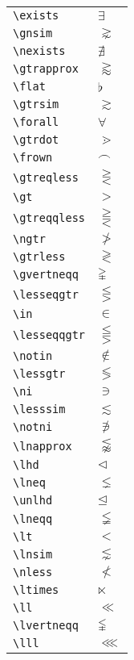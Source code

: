 \documentclass[text,xhtml,itex]{internet}
\begin{document}
\begin{tabular}{ll}
\verb+\exists+ & \(\exists\) \\
\verb+\gnsim+ & \(\gnsim\) \\
\verb+\nexists+               & \(\nexists\) \\
\verb+\gtrapprox+ & \(\gtrapprox\) \\
\verb+\flat+ & \(\flat\)            \\
\verb+\gtrsim+ & \(\gtrsim\) \\
\verb+\forall+ & \(\forall\) \\
\verb+\gtrdot+ & \(\gtrdot\) \\
\verb+\frown+                 & \(\frown\) \\
\verb+\gtreqless+ & \(\gtreqless\) \\
\verb+\gt+                    & \(\gt\) \\
\verb+\gtreqqless+ & \(\gtreqqless\) \\
\verb+\ngtr+ & \(\ngtr\)            \\
\verb+\gtrless+ & \(\gtrless\) \\
\verb+\gvertneqq+         & \(\gvertneqq\) \\
\verb+\lesseqgtr+ & \(\lesseqgtr\) \\
\verb+\in+ & \(\in\)            \\
\verb+\lesseqqgtr+ & \(\lesseqqgtr\) \\
\verb+\notin+ & \(\notin\) \\
\verb+\lessgtr+ & \(\lessgtr\) \\
\verb+\ni+                & \(\ni\) \\
\verb+\lesssim+ & \(\lesssim\) \\
\verb+\notni+ & \(\notni\)         \\
\verb+\lnapprox+ & \(\lnapprox\) \\
\verb+\lhd+ & \(\lhd\) \\
\verb+\lneq+ & \(\lneq\) \\
\verb+\unlhd+             & \(\unlhd\) \\
\verb+\lneqq+ & \(\lneqq\) \\
\verb+\lt+                & \(\lt\) \\
\verb+\lnsim+ & \(\lnsim\) \\
\verb+\nless+ & \(\nless\) \\
\verb+\ltimes+            & \(\ltimes\) \\
\verb+\ll+ & \(\ll\)            \\
\verb+\lvertneqq+ & \(\lvertneqq\) \\
\verb+\lll+ & \(\lll\) \\

\end{tabular}
\end{document}
